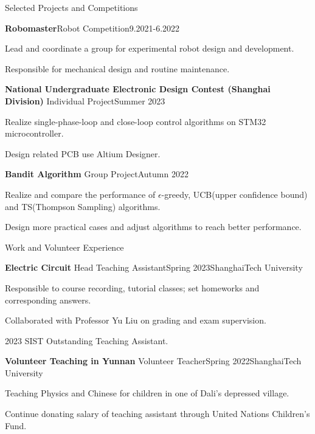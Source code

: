 \documentclass[]{ZhongtaoGuan-resume}
\begin{document}
\begin{section}{Selected Projects and Competitions} 
 \begin{subsection}{\textbf{Robomaster}}{Robot Competition}{9.2021-6.2022}{}
     \item{Lead and coordinate a group for experimental robot design and development.}
     \item{Responsible for mechanical design and routine maintenance.}

 \end{subsection}
 \begin{subsection}{\textbf{National Undergraduate Electronic Design Contest (Shanghai Division)}}
     {Individual Project}{Summer 2023}{}
     \item{Realize single-phase-loop and close-loop control algorithms on STM32 microcontroller.}
     \item{Design related PCB use Altium Designer.}
 \end{subsection}
 \begin{subsection}{\textbf{Bandit Algorithm}}
     {Group Project}{Autumn 2022}{}
     \item{Realize and compare the performance of $\epsilon$-greedy, UCB(upper confidence bound) and TS(Thompson Sampling) algorithms.}
     \item{Design more practical cases and adjust algorithms to reach better performance.}
 \end{subsection}
\end{section}

\newpage

\begin{section}{Work and Volunteer Experience}
 \begin{subsection}{\textbf{Electric Circuit}}
     {Head Teaching Assistant}{Spring 2023}{ShanghaiTech University}
     \item{Responsible to course recording, tutorial classes; set homeworks and corresponding answers.}
     \item {Collaborated with Professor Yu Liu on grading and exam supervision.}
     \item{2023 SIST Outstanding Teaching Assistant.}
 \end{subsection}
 \begin{subsection}{\textbf{Volunteer Teaching in Yunnan}}
     {Volunteer Teacher}{Spring 2022}{ShanghaiTech University}
     \item{Teaching Physics and Chinese for children in one of Dali's depressed village.}
     \item{Continue donating salary of teaching assistant through United Nations Children's Fund.}
 \end{subsection}
\end{section}
\end{document}
